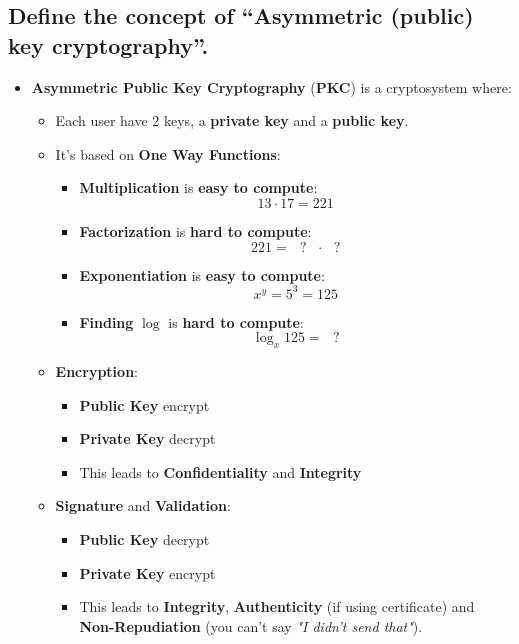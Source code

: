 \documentclass[9pt, letterpaper]{article}
\begin{document}
\subsection{Define the concept of “Asymmetric (public) key cryptography”.}
\begin{itemize}
	\item \textbf{Asymmetric Public Key Cryptography} (\textbf{PKC}) is a cryptosystem where:
	      \begin{itemize}
		      \item Each user have $2$ keys, a \textbf{private key} and a \textbf{public key}.
		      \item It's based on \textbf{One Way Functions}:
		            \begin{itemize}
			            \item \textbf{Multiplication} is \textbf{easy to compute}: $$ 13\cdot 17 = 221 $$
			            \item \textbf{Factorization} is \textbf{hard to compute}: $$ 221 = \mbox{  } ? \mbox{ }\cdot \mbox{ } ? $$
			            \item \textbf{Exponentiation} is \textbf{easy to compute}: $$ x^y = 5^3 = 125 $$
			            \item \textbf{Finding} $\log$ is \textbf{hard to compute}: $$ \log_x125 = \mbox{ } ? $$
		            \end{itemize}
		      \item \textbf{Encryption}:
		            \begin{itemize}
			            \item \textbf{Public Key} encrypt
			            \item \textbf{Private Key} decrypt
			            \item This leads to \textbf{Confidentiality} and \textbf{Integrity}
		            \end{itemize}
		      \item \textbf{Signature} and \textbf{Validation}:
		            \begin{itemize}
			            \item \textbf{Public Key} decrypt
			            \item \textbf{Private Key} encrypt
			            \item This leads to \textbf{Integrity}, \textbf{Authenticity} (if using certificate) and \textbf{Non-Repudiation} (you can't say \textit{"I didn't send that"}).
		            \end{itemize}
	      \end{itemize}
\end{itemize}
\end{document}
